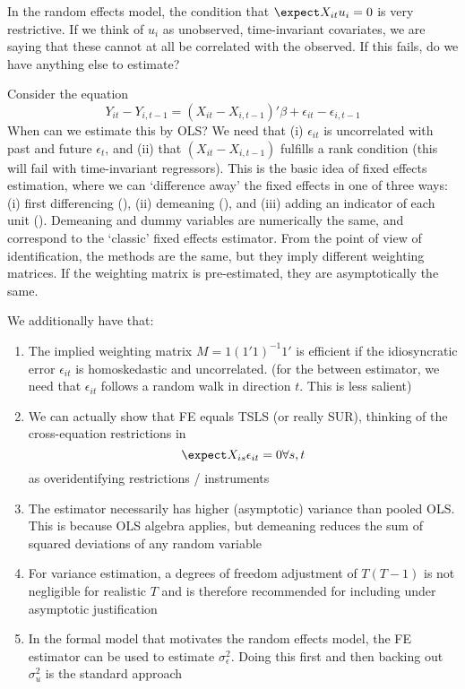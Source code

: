 \documentclass[10pt]{article}
\begin{document}
\begin{remark}
	In the random effects model, the condition that $\expect X_{it}u_i = 0$ is very restrictive. If we think of $u_i$ as unobserved, time-invariant covariates, we are saying that these cannot at all be correlated with the observed. If this fails, do we have anything else to estimate?
	
	Consider the  equation \[Y_{it} - Y_{i,t-1} = (X_{it} - X_{i,t-1})'\beta + \epsilon_{it} - \epsilon_{i,t-1}\]
	When can we estimate this by OLS? We need that (i) $\epsilon_{it}$ is uncorrelated with past and future $\epsilon_{t}$, and (ii) that $(X_{it} - X_{i,t-1})$ fulfills a rank condition (this will fail with time-invariant regressors). This is the basic idea of fixed effects estimation, where we can `difference away' the fixed effects in one of three ways: (i) first differencing (), (ii) demeaning (), and (iii) adding an indicator of each unit (). Demeaning and dummy variables are numerically the same, and correspond to the `classic' fixed effects estimator. From the point of view of identification, the methods are the same, but they imply different weighting matrices. If the weighting matrix is pre-estimated, they are asymptotically the same.
	
	We additionally have that:
	\begin{enumerate}
		\item The implied weighting matrix $M = 1 (1'1)^{-1}1'$ is efficient if the idiosyncratic error $\epsilon_{it}$ is homoskedastic and uncorrelated. (for the between estimator, we need that $\epsilon_{it}$ follows a random walk in direction $t$. This is less salient)
		\item We can actually show that FE equals TSLS (or really SUR), thinking of the cross-equation restrictions in \[\expect X_{is} \epsilon_{it} = 0 \forall s,t\]as overidentifying restrictions / instruments
		\item The estimator necessarily has higher (asymptotic) variance than pooled OLS. This is because OLS algebra applies, but demeaning reduces the sum of squared deviations of any random variable
		\item For variance estimation, a degrees of freedom adjustment of $T(T-1)$ is not negligible for realistic $T$ and is therefore recommended for including under asymptotic justification
		\item In the formal model that motivates the random effects model, the FE estimator can be used to estimate $\sigma_\epsilon^2$. Doing this first and then backing out $\sigma^2_u$ is the standard approach
	\end{enumerate}
	

\end{remark}
\end{document}
